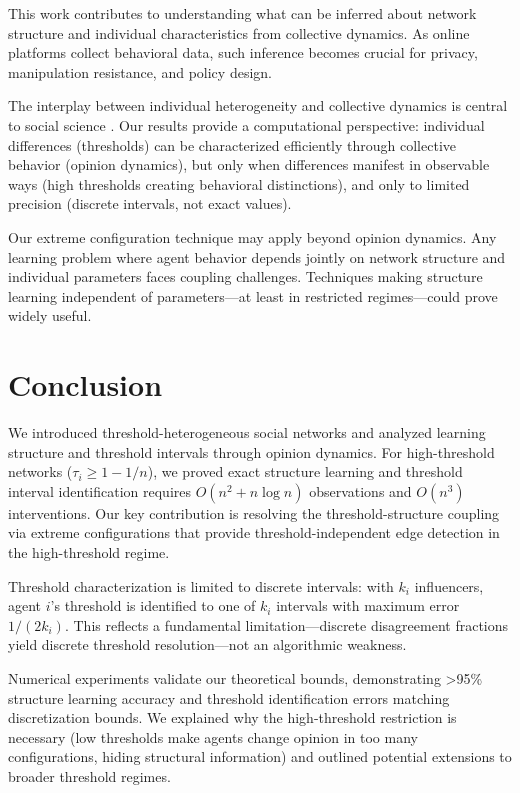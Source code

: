 \documentclass[conference]{IEEEtran}
\begin{document}
This work contributes to understanding what can be inferred about network structure and individual characteristics from collective dynamics. As online platforms collect behavioral data, such inference becomes crucial for privacy, manipulation resistance, and policy design.

The interplay between individual heterogeneity and collective dynamics is central to social science \cite{granovetter1978threshold}. Our results provide a computational perspective: individual differences (thresholds) can be characterized efficiently through collective behavior (opinion dynamics), but only when differences manifest in observable ways (high thresholds creating behavioral distinctions), and only to limited precision (discrete intervals, not exact values).

Our extreme configuration technique may apply beyond opinion dynamics. Any learning problem where agent behavior depends jointly on network structure and individual parameters faces coupling challenges. Techniques making structure learning independent of parameters—at least in restricted regimes—could prove widely useful.

\section{Conclusion}

We introduced threshold-heterogeneous social networks and analyzed learning structure and threshold intervals through opinion dynamics. For high-threshold networks ($\tau_i \geq 1 - 1/n$), we proved exact structure learning and threshold interval identification requires $O(n^2 + n \log n)$ observations and $O(n^3)$ interventions. Our key contribution is resolving the threshold-structure coupling via extreme configurations that provide threshold-independent edge detection in the high-threshold regime.

Threshold characterization is limited to discrete intervals: with $k_i$ influencers, agent $i$'s threshold is identified to one of $k_i$ intervals with maximum error $1/(2k_i)$. This reflects a fundamental limitation—discrete disagreement fractions yield discrete threshold resolution—not an algorithmic weakness.

Numerical experiments validate our theoretical bounds, demonstrating >95\% structure learning accuracy and threshold identification errors matching discretization bounds. We explained why the high-threshold restriction is necessary (low thresholds make agents change opinion in too many configurations, hiding structural information) and outlined potential extensions to broader threshold regimes.
\end{document}
